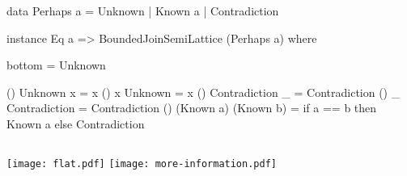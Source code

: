 

\begin{frame}[fragile]

\begin{haskellcode}
data Perhaps a = Unknown | Known a | Contradiction
\end{haskellcode}

\pnl

\begin{haskellcode}
instance Eq a => BoundedJoinSemiLattice (Perhaps a) where

  bottom = Unknown

  (\/) Unknown x           = x
  (\/) x       Unknown     = x
  (\/) Contradiction _     = Contradiction
  (\/) _     Contradiction = Contradiction
  (\/) (Known a) (Known b) =
    if a == b
      then Known a
      else Contradiction
\end{haskellcode}

\end{frame}





\begin{frame}
\begin{columns}
\texttt{[image: flat.pdf]}
\pause
{}
\texttt{[image: more-information.pdf]}
\end{columns}
\end{frame}

